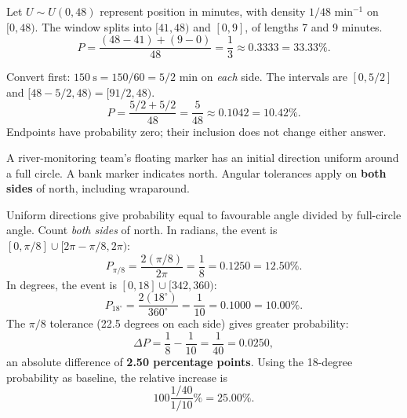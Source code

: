
Let $U\sim U(0,48)$ represent position in minutes, with density $1/48$ min$^{-1}$ on $[0,48)$.
The window splits into $[41,48)$ and $[0,9]$, of lengths 7 and 9 minutes.
\[P=\frac{(48-41)+(9-0)}{48}=\boxed{\frac13\approx0.3333=33.33\%}.\]

Convert first: $150\ \mathrm s=150/60=5/2$ min on \emph{each} side.
The intervals are $[0,5/2]$ and $[48-5/2,48)=[91/2,48)$.
\[P=\frac{5/2+5/2}{48}=\boxed{\frac5{48}\approx0.1042=10.42\%}.\]
Endpoints have probability zero; their inclusion does not change either answer.

\clearpage\def\CurrentProblem{drone}
A river-monitoring team's floating marker has an initial direction uniform around a full circle. A bank marker indicates north. Angular tolerances apply on \textbf{both sides} of north, including wraparound.


Uniform directions give probability equal to favourable angle divided by full-circle angle. Count \emph{both sides} of north.
In radians, the event is $[0,\pi/8]\cup[2\pi-\pi/8,2\pi)$:
\[P_{\pi/8}=\frac{2(\pi/8)}{2\pi}=\boxed{\frac18=0.1250=12.50\%}.\]
In degrees, the event is $[0,18]\cup[342,360)$:
\[P_{18^\circ}=\frac{2(18^\circ)}{360^\circ}=\boxed{\frac1{10}=0.1000=10.00\%}.\]
The $\pi/8$ tolerance (22.5 degrees on each side) gives greater probability:
\[\Delta P=\frac18-\frac1{10}=\boxed{\frac1{40}=0.0250},\]
an absolute difference of \textbf{2.50 percentage points}.
Using the 18-degree probability as baseline, the relative increase is
\[100\frac{1/40}{1/10}\%=25.00\%.\]

